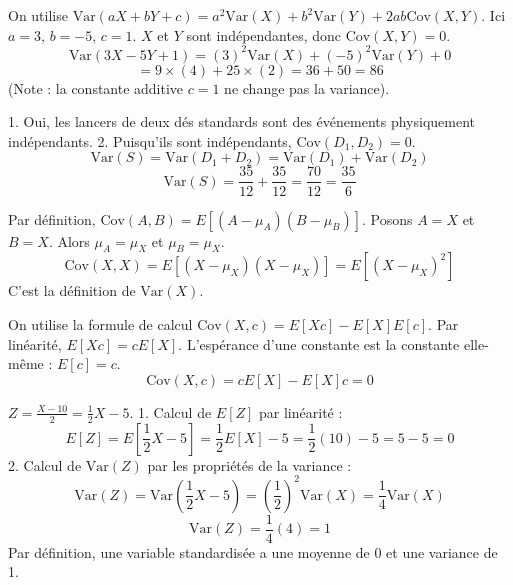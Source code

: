 \begin{correctionbox}
On utilise $\text{Var}(aX + bY + c) = a^2 \text{Var}(X) + b^2 \text{Var}(Y) + 2ab\text{Cov}(X,Y)$.
Ici $a=3$, $b=-5$, $c=1$. $X$ et $Y$ sont indépendantes, donc $\text{Cov}(X,Y)=0$.
$$ \text{Var}(3X - 5Y + 1) = (3)^2 \text{Var}(X) + (-5)^2 \text{Var}(Y) + 0 $$
$$ = 9 \times (4) + 25 \times (2) = 36 + 50 = 86 $$
(Note : la constante additive $c=1$ ne change pas la variance).
\end{correctionbox}

\begin{correctionbox}
1.  Oui, les lancers de deux dés standards sont des événements physiquement indépendants.
2.  Puisqu'ils sont indépendants, $\text{Cov}(D_1, D_2) = 0$.
    $$ \text{Var}(S) = \text{Var}(D_1 + D_2) = \text{Var}(D_1) + \text{Var}(D_2) $$
    $$ \text{Var}(S) = \frac{35}{12} + \frac{35}{12} = \frac{70}{12} = \frac{35}{6} $$
\end{correctionbox}

\begin{correctionbox}
Par définition, $\text{Cov}(A, B) = E[(A-\mu_A)(B-\mu_B)]$.
Posons $A=X$ et $B=X$. Alors $\mu_A = \mu_X$ et $\mu_B = \mu_X$.
$$ \text{Cov}(X, X) = E[(X-\mu_X)(X-\mu_X)] = E[(X-\mu_X)^2] $$
C'est la définition de $\text{Var}(X)$.
\end{correctionbox}

\begin{correctionbox}
On utilise la formule de calcul $\text{Cov}(X,c) = E[Xc] - E[X]E[c]$.
Par linéarité, $E[Xc] = cE[X]$.
L'espérance d'une constante est la constante elle-même : $E[c] = c$.
$$ \text{Cov}(X, c) = cE[X] - E[X]c = 0 $$
\end{correctionbox}


\begin{correctionbox}
$Z = \frac{X - 10}{2} = \frac{1}{2}X - 5$.
1.  Calcul de $E[Z]$ par linéarité :
    $$ E[Z] = E\left[ \frac{1}{2}X - 5 \right] = \frac{1}{2}E[X] - 5 = \frac{1}{2}(10) - 5 = 5 - 5 = 0 $$
2.  Calcul de $\text{Var}(Z)$ par les propriétés de la variance :
    $$ \text{Var}(Z) = \text{Var}\left( \frac{1}{2}X - 5 \right) = \left(\frac{1}{2}\right)^2 \text{Var}(X) = \frac{1}{4} \text{Var}(X) $$
    $$ \text{Var}(Z) = \frac{1}{4}(4) = 1 $$
    Par définition, une variable standardisée a une moyenne de 0 et une variance de 1.
\end{correctionbox}

